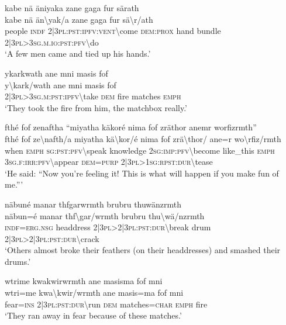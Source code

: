 \ea\label{ex:11:a2558}
kabe nä äniyaka zane gaga fur särath\\
\gll kabe	nä	än{\textbackslash}yak/a	zane	gaga	fur	sä{\textbackslash}r/ath\\
     people	\textsc{indf}	2|3\textsc{pl}:\textsc{pst}:\textsc{ipfv}:\textsc{vent}{\textbackslash}come	\textsc{dem}:\textsc{prox}	hand	bundle	2|3\textsc{pl}>3\textsc{sg}.\textsc{m}.\textsc{io}:\textsc{pst}:\textsc{pfv}{\textbackslash}do\\
\glt `A few men came and tied up his hands.'
\z

\ea\label{ex:11:a2559}
ykarkwath ane mni masis fof\\
\gll y{\textbackslash}kark/wath	ane	mni	masis	fof\\
     2|3\textsc{pl}>3\textsc{sg}.\textsc{m}:\textsc{pst}:\textsc{ipfv}{\textbackslash}take	\textsc{dem}	fire	matches	\textsc{emph}\\
\glt `They took the fire from him, the matchbox really.'
\z

\ea\label{ex:11:a2561}
fthé fof zenaftha ``miyatha käkoré nima fof zräthor anemr worfizrmth''\\
\gll fthé	fof	ze{\textbackslash}nafth/a	miyatha	kä{\textbackslash}kor/é	nima	fof	zrä{\textbackslash}thor/	ane=r	wo{\textbackslash}rfiz/rmth\\
     when	\textsc{emph}	\textsc{sg}:\textsc{pst}:\textsc{pfv}{\textbackslash}speak	knowledge	2\textsc{sg}:\textsc{imp}:\textsc{pfv}{\textbackslash}become	like\_this	\textsc{emph}	3\textsc{sg}.\textsc{f}:\textsc{irr}:\textsc{pfv}{\textbackslash}appear	\textsc{dem}=\textsc{purp}	2|3\textsc{pl}>1\textsc{sg}:\textsc{rpst}:\textsc{dur}{\textbackslash}tease\\
\glt `He said: ``Now you're feeling it! This is what will happen if you make fun of me.'''
\z

\ea\label{ex:11:a2562}
näbuné manar thfgarwrmth brubru thuwänzrmth\\
\gll näbun=é	manar	thf{\textbackslash}gar/wrmth	brubru	thu{\textbackslash}wä/nzrmth\\
     \textsc{indf}=\textsc{erg}.\textsc{nsg}	headdress	2|3\textsc{pl}>2|3\textsc{pl}:\textsc{pst}:\textsc{dur}{\textbackslash}break	drum	2|3\textsc{pl}>2|3\textsc{pl}:\textsc{pst}:\textsc{dur}{\textbackslash}crack\\
\glt `Others almost broke their feathers (on their headdresses) and smashed their drums.'
\z

\ea\label{ex:11:a2563}
wtrime kwakwirwrmth ane masisma fof mni\\
\gll wtri=me	kwa{\textbackslash}kwir/wrmth	ane	masis=ma	fof	mni\\
     fear=\textsc{ins}	2|3\textsc{pl}:\textsc{pst}:\textsc{dur}{\textbackslash}run	\textsc{dem}	matches=\textsc{char}	\textsc{emph}	fire\\
\glt `They ran away in fear because of these matches.'
\z

